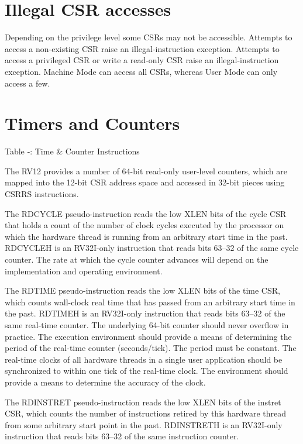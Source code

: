 \section{Illegal CSR accesses}\label{illegal-csr-accesses}

Depending on the privilege level some CSRs may not be accessible.
Attempts to access a non-existing CSR raise an illegal-instruction
exception. Attempts to access a privileged CSR or write a read-only CSR
raise an illegal-instruction exception. Machine Mode can access all
CSRs, whereas User Mode can only access a
few.

\section{Timers and Counters}\label{timers-and-counters}

\missingfigure{}

Table ‑: Time \& Counter Instructions

The RV12 provides a number of 64-bit read-only user-level counters,
which are mapped into the 12-bit CSR address space and accessed in
32-bit pieces using CSRRS instructions.

The RDCYCLE pseudo-instruction reads the low XLEN bits of the cycle CSR
that holds a count of the number of clock cycles executed by the
processor on which the hardware thread is running from an arbitrary
start time in the past. RDCYCLEH is an RV32I-only instruction that reads
bits 63--32 of the same cycle counter. The rate at which the cycle
counter advances will depend on the implementation and operating
environment.

The RDTIME pseudo-instruction reads the low XLEN bits of the time CSR,
which counts wall-clock real time that has passed from an arbitrary
start time in the past. RDTIMEH is an RV32I-only instruction that reads
bits 63--32 of the same real-time counter. The underlying 64-bit counter
should never overflow in practice. The execution environment should
provide a means of determining the period of the real-time counter
(seconds/tick). The period must be constant. The real-time clocks of all
hardware threads in a single user application should be synchronized to
within one tick of the real-time clock. The environment should provide a
means to determine the accuracy of the clock.

The RDINSTRET pseudo-instruction reads the low XLEN bits of the instret
CSR, which counts the number of instructions retired by this hardware
thread from some arbitrary start point in the past. RDINSTRETH is an
RV32I-only instruction that reads bits 63--32 of the same instruction
counter.

